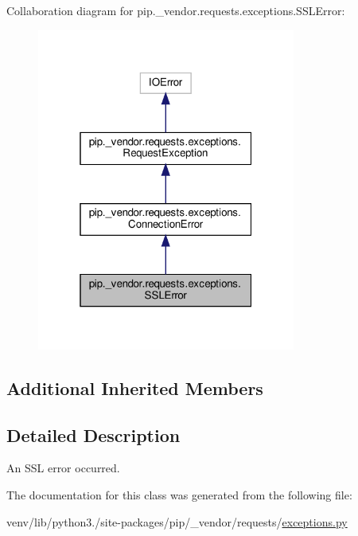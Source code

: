 Collaboration diagram for pip.\+\_\+vendor.\+requests.\+exceptions.\+S\+S\+L\+Error\+:
\nopagebreak
\begin{figure}[H]
\begin{center}
\leavevmode
\includegraphics[width=241pt]{classpip_1_1__vendor_1_1requests_1_1exceptions_1_1SSLError__coll__graph}
\end{center}
\end{figure}
\subsection*{Additional Inherited Members}


\subsection{Detailed Description}
\begin{DoxyVerb}An SSL error occurred.\end{DoxyVerb}
 

The documentation for this class was generated from the following file\+:\begin{DoxyCompactItemize}
\item 
venv/lib/python3./site-\/packages/pip/\+\_\+vendor/requests/\hyperlink{pip_2__vendor_2requests_2exceptions_8py}{exceptions.\+py}\end{DoxyCompactItemize}
